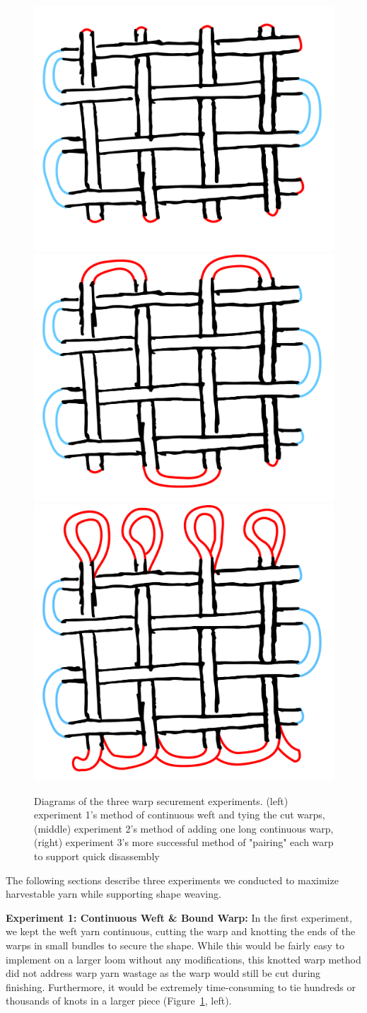 \begin{figure}
    \centering
    \includegraphics[width=0.3\linewidth]{figs/UF_weave_contweft.pdf}
    \includegraphics[width=0.3\linewidth]{figs/UF_weave_contweftwarp.pdf}
    \includegraphics[width=0.3\linewidth]{figs/UF_weave_contweftwarp2.pdf}
    \caption[Unravel-able weaving experiments.]{Diagrams of the three warp securement experiments. (left) experiment 1's method of continuous weft and tying the cut warps, (middle) experiment 2's method of adding one long continuous warp, (right) experiment 3's more successful method of "pairing" each warp to support quick disassembly}
    \label{fig:warpDiagrams}
\end{figure}

The following sections describe three experiments we conducted to maximize harvestable yarn while supporting shape weaving.

\textbf{Experiment 1: Continuous Weft \& Bound Warp:} In the first experiment, we  kept the weft yarn continuous, cutting the warp and knotting the ends of the warps in small bundles to secure the shape. While this would be fairly easy to implement on a larger loom without any modifications, this knotted warp method did not address warp yarn wastage as the warp would still be cut during finishing. Furthermore, it would be extremely time-consuming to tie hundreds or thousands of knots in a larger piece (Figure~\ref{fig:warpDiagrams}, left).

